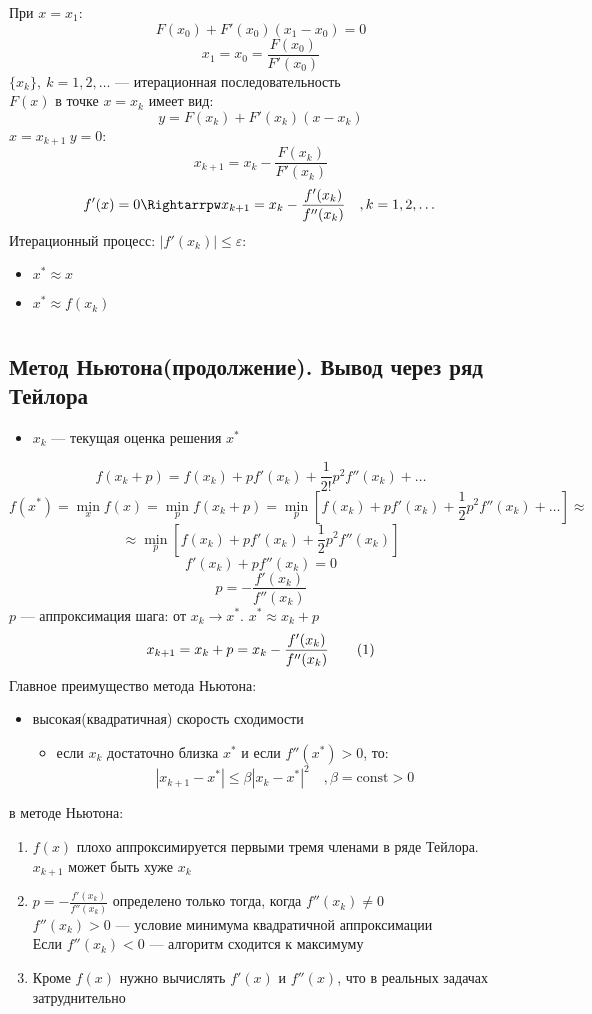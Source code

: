 \documentclass[oneside]{book}
\newcommand\addtag{\refstepcounter{equation}\tag{\theequation}}
\newcommand{\const}{\text{const}}
\theoremstyle{plain}
\theoremstyle{remark}
\theoremstyle{definition}
\begin{document}
При \(x = x_1\):
\[ F(x_0) + F'(x_0)(x_1 - x_0) = 0 \]
\[ x_1 = x_0 = \frac{F(x_0)}{F'(x_0)} \]
\(\{x_k\},\ k = 1, 2, \dots\) --- итерационная последовательность \\
\(F(x)\) в точке \(x = x_k\) имеет вид:
\[ y = F(x_k) + F'(x_k)(x - x_k) \]
\(x = x_{k + 1}\ y = 0\):
\[ x_{k+1} = x_k - \frac{F(x_k)}{F'(x_k)} \]
\[ f'(x) = 0 \Rightarrpw x_{k + 1} = x_k - \frac{f'(x_k)}{f''(x_k)}\quad,k=1,2,\dots \]
Итерационный процесс: \(|f'(x_k)| \le \varepsilon\):
\begin{itemize}
\item \(x^* \approx x\)
\item \(x^* \approx f(x_k)\)
\end{itemize}
\chapter{}
\label{sec:orgf8c3755}
\section{Метод Ньютона(продолжение). Вывод через ряд Тейлора}
\label{sec:orgb928a71}
\begin{itemize}
\item \(x_k\) --- текущая оценка решения \(x^*\)
\end{itemize}
\[ f(x_k + p) = f(x_k) + pf'(x_k) + \frac{1}{2!}p^2f''(x_k) + \dots \]
\[ f(x^*) = \min_x f(x) = \min_p f(x_k + p) = \min_p [ f(x_k) + pf'(x_k) + \frac{1}{2}p^2 f''(x_k)  + \dots ] \approx \]
\[ \approx \min_p[f(x_k) + pf'(x_k) + \frac{1}{2}p^2 f''(x_k)] \]
\[ f'(x_k) + pf''(x_k) = 0 \]
\[ p = -\frac{f'(x_k)}{f''(x_k)} \]
\(p\) --- аппроксимация шага: от \(x_k \to x^*\). \(x^* \approx x_k + p\)
\[ x_{k + 1} = x_k + p = x_k - \frac{f'(x_k)}{f''(x_k)} \label{nuton_1_5}\addtag \]
Главное преимущество метода Ньютона:
\begin{itemize}
\item высокая(квадратичная) скорость сходимости
\begin{itemize}
\item если \(x_k\) достаточно близка \(x^*\) и если \(f''(x^*) > 0\), то:
\[ |x_{k+1} - x^*| \le \beta|x_k - x^*|^2\quad, \beta = \const > 0 \]
\end{itemize}
\end{itemize}

 в методе Ньютона:
\begin{enumerate}
\item \(f(x)\) плохо аппроксимируется первыми тремя членами в ряде Тейлора. \(x_{k+1}\) может быть хуже \(x_k\)
\item \(p=-\frac{f'(x_k)}{f''(x_k)}\) определено только тогда, когда \(f''(x_k)\neq0\) \\
\(f''(x_k) > 0\) --- условие минимума квадратичной аппроксимации \\
Если \(f''(x_k) < 0\) --- алгоритм сходится к максимуму
\item Кроме \(f(x)\) нужно вычислять \(f'(x)\) и \(f''(x)\), что в реальных задачах затруднительно
\end{enumerate}
\end{document}
